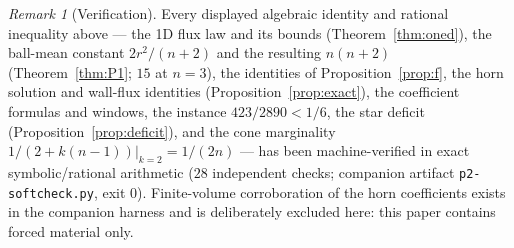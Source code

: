 \documentclass[10pt]{article}
\theoremstyle{remark}
\newtheorem{remark}[theorem]{Remark}
\begin{document}
\begin{remark}[Verification]\label{rem:verify}
Every displayed algebraic identity and rational inequality above --- the 1D
flux law and its bounds (Theorem~\ref{thm:oned}), the ball-mean constant
$2r^2/(n+2)$ and the resulting $n(n+2)$ (Theorem~\ref{thm:P1}; $15$ at $n=3$),
the identities of Proposition~\ref{prop:f}, the horn solution and wall-flux
identities (Proposition~\ref{prop:exact}), the coefficient formulas and
windows, the instance $423/2890<1/6$, the star deficit
(Proposition~\ref{prop:deficit}), and the cone marginality
$1/(2+k(n-1))|_{k=2}=1/(2n)$ --- has been machine-verified in exact
symbolic/rational arithmetic ($28$ independent checks; companion artifact
\texttt{p2-softcheck.py}, exit $0$). Finite-volume corroboration of the horn
coefficients exists in the companion harness and is deliberately excluded
here: this paper contains forced material only.
\end{remark}
\end{document}
